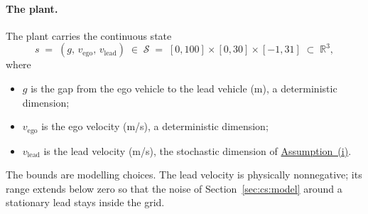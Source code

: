 \documentclass[11pt,a4paper]{article}
\newcommand{\R}{\mathbb{R}}
\newcommand{\vego}{v_{\text{ego}}}
\newcommand{\vlead}{v_{\text{lead}}}
\theoremstyle{plain}
\theoremstyle{remark}
\begin{document}
	\paragraph{The plant.}
	The plant carries the continuous state
	\begin{equation}
		s \;=\; (g,\, \vego,\, \vlead) \;\in\; \mathcal{S} \;=\; [0, 100] \times [0, 30] \times [-1, 31] \;\subset\; \R^3,
		\label{eq:statespace}
	\end{equation}
	where
	\begin{itemize}
		\item $g$ is the gap from the ego vehicle to the lead vehicle (m), a deterministic dimension;
		\item $\vego$ is the ego velocity (m/s), a deterministic dimension;
		\item $\vlead$ is the lead velocity (m/s), the stochastic dimension of \hyperref[ass:sysclass]{Assumption~(i)}.
	\end{itemize}
	The bounds are modelling choices. The lead velocity is physically nonnegative; its range extends below zero so that the noise of Section~\ref{sec:cs:model} around a stationary lead stays inside the grid.
	
\end{document}
